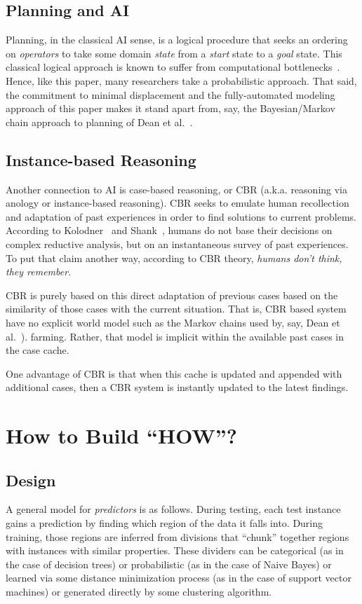 \documentclass[conference]{IEEEtran}
\begin{document}
\subsection{Planning and AI}
Planning, in the classical AI sense, is a logical procedure
that seeks an ordering on {\em operators} to take some domain
{\em state} from a {\em start} state to a {\em goal} state.
This classical logical approach is known to suffer from
computational bottlenecks~\cite{Bylander1994}. Hence,
like this paper,
many researchers take a probabilistic approach.
That said, the commitment to minimal displacement and the fully-automated
modeling approach of this paper makes it stand apart from, say,
  the Bayesian/Markov chain approach to planning of Dean et al.~\cite{dean1995planning}.

\subsection{Instance-based Reasoning}
Another  connection to AI is case-based reasoning, or CBR
(a.k.a. reasoning via anology or instance-based reasoning).
CBR seeks to emulate human recollection and adaptation
of past experiences in order to find solutions to current
problems. According to 
Kolodner~\cite{Kolodner1992} and Shank~\cite{Schank1977},
humans do not base their decisions
on complex reductive analysis, but on an instantaneous survey of past experiences.
To put that claim another way, according to CBR theory, 
{\em humans  don’t
think,  they remember.}

CBR is purely based on this direct
adaptation of previous cases based on the similarity of
those cases with the current situation. That is, 
CBR based system have no explicit world model such as the Markov
chains used by, say, Dean et al.~\cite{dean1995planning}).
farming.
Rather, that model is implicit within  the available past
cases in the case cache. 

One  advantage of CBR is that
when this  cache is  updated and appended with additional cases, then a CBR system is instantly updated
to the latest findings.




\section{How to Build ``HOW''?}\label{sec:mm}

\subsection{Design}
A general model for {\em predictors} is as follows. 
During testing, each test instance gains a prediction 
by finding which region of the data it falls into.
During training, those regions are inferred from
divisions that ``chunk'' together regions with instances
with similar properties. These dividers can be categorical (as in the case of decision trees) or probabilistic (as in the
case of Naive Bayes) or learned via some distance minimization
process 
(as in the case of support vector machines) or generated
directly by some clustering algorithm. 
\end{document}
